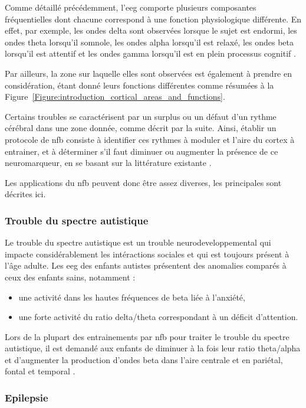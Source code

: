 Comme détaillé précédemment, l'\gls{eeg} comporte plusieurs composantes fréquentielles dont chacune correspond à une fonction physiologique différente.
En effet, par exemple, les ondes delta sont observées lorsque le sujet est endormi, les ondes theta lorsqu'il somnole, les ondes alpha lorsqu'il est relaxé, 
les ondes beta lorsqu'il est attentif et les ondes gamma lorsqu'il est en plein processus cognitif \citep{Marzbani2016}. 

Par ailleurs, la zone sur laquelle elles sont observées est également à prendre en considération, étant donné leurs fonctions différentes comme résumées
à la Figure~\ref{Figure:introduction_cortical_areas_and_functions}.

Certains troubles se caractérisent par un surplus ou un défaut d'un rythme cérébral dans une zone donnée, comme décrit par la suite. 
Ainsi, établir un protocole de \gls{nfb} consiste à identifier ces rythmes à moduler et l'aire 
du cortex à entrainer, et à déterminer s'il faut diminuer ou augmenter la présence de ce neuromarqueur, en se basant sur la littérature 
existante \citep{Micoulaud2019}.

Les applications du \gls{nfb} peuvent donc être assez diverses, les principales sont décrites ici. 

\subsubsection{Trouble du spectre autistique}

Le trouble du spectre autistique est un trouble neurodeveloppemental qui impacte considérablement les intéractions sociales et qui est toujours présent à 
l'âge adulte. Les \gls{eeg} des enfants autistes présentent des anomalies comparés à ceux des enfants sains, notamment \citep{Coben2010, Kouijzer2010} :
\begin{itemize}
\item une activité dans les hautes fréquences de beta liée à l'anxiété,
\item une forte activité du ratio delta/theta correspondant à un déficit d'attention.
\end{itemize}
Lors de la plupart des entrainements par \gls{nfb} pour traiter le trouble du spectre autistique, il est demandé aux enfants de diminuer à la fois leur ratio 
theta/alpha et d'augmenter la production d'ondes beta dans l'aire centrale \citep{Thompson2010} et en pariétal, fontal et temporal \citep{Othmer2007}. 

\subsubsection{Epilepsie}


